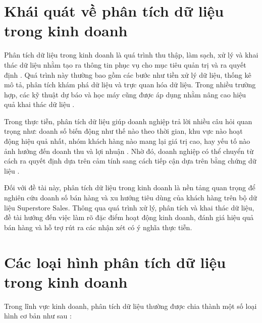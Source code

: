 \section{Khái quát về phân tích dữ liệu trong kinh doanh}

Phân tích dữ liệu trong kinh doanh là quá trình thu thập, làm sạch, xử lý và khai thác dữ liệu nhằm tạo ra thông tin phục vụ cho mục tiêu quản trị và ra quyết định \cite{islr,esl}. Quá trình này thường bao gồm các bước như tiền xử lý dữ liệu, thống kê mô tả, phân tích khám phá dữ liệu và trực quan hóa dữ liệu. Trong nhiều trường hợp, các kỹ thuật dự báo và học máy cũng được áp dụng nhằm nâng cao hiệu quả khai thác dữ liệu \cite{islr,esl}.

Trong thực tiễn, phân tích dữ liệu giúp doanh nghiệp trả lời nhiều câu hỏi quan trọng như: doanh số biến động như thế nào theo thời gian, khu vực nào hoạt động hiệu quả nhất, nhóm khách hàng nào mang lại giá trị cao, hay yếu tố nào ảnh hưởng đến doanh thu và lợi nhuận \cite{islr}. Nhờ đó, doanh nghiệp có thể chuyển từ cách ra quyết định dựa trên cảm tính sang cách tiếp cận dựa trên bằng chứng dữ liệu \cite{esl}.

Đối với đề tài này, phân tích dữ liệu trong kinh doanh là nền tảng quan trọng để nghiên cứu doanh số bán hàng và xu hướng tiêu dùng của khách hàng trên bộ dữ liệu Superstore Sales. Thông qua quá trình xử lý, phân tích và khai thác dữ liệu, đề tài hướng đến việc làm rõ đặc điểm hoạt động kinh doanh, đánh giá hiệu quả bán hàng và hỗ trợ rút ra các nhận xét có ý nghĩa thực tiễn.

\section{Các loại hình phân tích dữ liệu trong kinh doanh}

Trong lĩnh vực kinh doanh, phân tích dữ liệu thường được chia thành một số loại hình cơ bản như sau \cite{islr,esl}:

